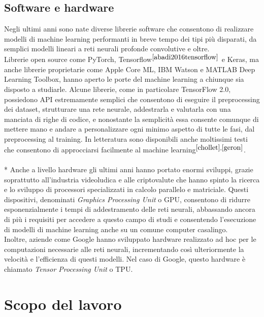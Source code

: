 \subsection{Software e hardware}
Negli ultimi anni sono nate diverse librerie software che consentono di realizzare modelli di machine learning performanti in breve tempo dei tipi più disparati, da semplici modelli lineari a reti neurali profonde convolutive e oltre.\\
Librerie open source come PyTorch, Tensorflow$^{\cite{abadi2016tensorflow}}$ e Keras, ma anche librerie proprietarie come Apple Core ML, IBM Watson e MATLAB Deep Learning Toolbox, hanno aperto le porte del machine learning a chiunque sia disposto a studiarle. Alcune librerie, come in particolare TensorFlow 2.0, possiedono API estremamente semplici che consentono di eseguire il preprocessing dei dataset, strutturare una rete neurale, addestrarla e valutarla con una manciata di righe di codice, e nonostante la semplicità essa consente comunque di mettere mano e andare a personalizzare ogni minimo aspetto di tutte le fasi, dal preprocessing al training. In letteratura sono disponibili anche moltissimi testi che consentono di approcciarsi facilmente al machine learning$^{\cite{chollet},\cite{geron}}$.\\\\*
Anche a livello hardware gli ultimi anni hanno portato enormi sviluppi, grazie soprattutto all'industria videoludica e alle criptovalute che hanno spinto la ricerca e lo sviluppo di processori specializzati in calcolo parallelo e matriciale. Questi dispositivi, denominati \textit{Graphics Processing Unit} o GPU, consentono di ridurre esponenzialmente i tempi di addestramento delle reti neurali, abbassando ancora di più i requisiti per accedere a questo campo di studi e consentendo l'esecuzione di modelli di machine learning anche su un comune computer casalingo.\\
Inoltre, aziende come Google hanno sviluppato hardware realizzato ad hoc per le computazioni necessarie alle reti neurali, incrementando così ulteriormente la velocità e l'efficienza di questi modelli. Nel caso di Google, questo hardware è chiamato \textit{Tensor Processing Unit} o TPU.

\section{Scopo del lavoro}  %

